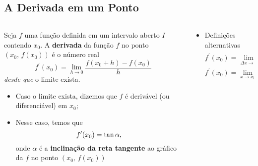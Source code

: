 \subsection{A Derivada em um Ponto}
\begin{frame}
  \begin{columns}[onlytextwidth]
    \begin{column}{0.5\textwidth}\vspace{-0.5cm}
      \begin{definition}[Derivada]
        Seja $f$ uma função definida em um intervalo aberto $I$ contendo $x_{0}$. A \textbf{derivada} da função $f$ no ponto $(x_{0},\,f(x_{0}))$ é o número real
        \begin{equation*}
          f^{\prime}(x_{0}) = \lim_{h\to 0}\frac{f(x_{0}+h)-f(x_{0})}{h}
        \end{equation*}
        \emph{desde que} o limite exista.
      \end{definition}
      \begin{highlight}
        \begin{itemize}
          \item Caso o limite exista, dizemos que $f$ é derivável (ou diferenciável) em $x_{0}$;
          \item Nesse caso, temos que\vspace*{-0.26cm}
          \begin{equation*}
            f^{\prime}(x_{0}) = \tan{\alpha},\vspace*{-0.26cm}
          \end{equation*}
          onde $\alpha$ é a \textbf{inclinação da reta tangente} ao gráfico da $f$ no ponto $(x_{0},\,f(x_{0}))$
        \end{itemize}
      \end{highlight}
    \end{column}
    \begin{column}{0.5\textwidth}\vspace{-0.5cm}
      \begin{itemize}
        \item Definições alternativas\small
        \begin{equation*}
          f^{\prime}(x_{0}) = \lim_{\Delta x\to 0}\frac{f(x_{0}+\Delta x)-f(x_{0})}{\Delta x}
        \end{equation*}
        \begin{equation*}
          f^{\prime}(x_{0}) = \lim_{x\to x_{0}}\frac{f(x)-f(x_{0})}{x - x_{0}}
        \end{equation*}

\end{itemize}
\end{column}
\end{columns}
\end{frame}
